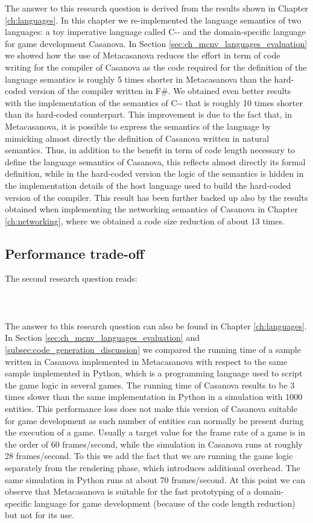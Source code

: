 The answer to this research question is derived from the results shown in Chapter \ref{ch:languages}. In this chapter we re-implemented the language semantics of two languages: a toy imperative language called C-{}- and the domain-specific language for game development Casanova. In Section \ref{sec:ch_mcnv_languages_evaluation} we showed how the use of Metacasanova reduces the effort in term of code writing for the compiler of Casanova as the code required for the definition of the language semantics is roughly 5 times shorter in Metacasanova than the hard-coded version of the compiler written in F\#. We obtained even better results with the implementation of the semantics of C-{}- that is roughly 10 times shorter than its hard-coded counterpart. This improvement is due to the fact that, in Metacasanova, it is possible to express the semantics of the language by mimicking almost directly the definition of Casanova written in natural semantics. Thus, in addition to the benefit in term of code length necessary to define the language semantics of Casanova, this reflects almost directly its formal definition, while in the hard-coded version the logic of the semantics is hidden in the implementation details of the host language used to build the hard-coded version of the compiler. This result has been further backed up also by the results obtained when implementing the networking semantics of Casanova in Chapter \ref{ch:networking}, where we obtained a code size reduction of about 13 times.

\subsection{Performance trade-off}
\label{subsec:ch_conclusion_rq2}
The second research question reads:\\\\
\researchQuestion{\rqContentTwo}\\\\

The answer to this research question can also be found in Chapter \ref{ch:languages}. In Section  \ref{sec:ch_mcnv_languages_evaluation} and \ref{subsec:code_generation_discussion} we compared the running time of a sample written in Casanova implemented in Metacasanova with respect to the same sample implemented in Python, which is a programming language used to script the game logic in several games. The running time of Casanova results to be 3 times slower than the same implementation in Python in a simulation with 1000 entities. This performance loss does not make this version of Casanova suitable for game development as such number of entities can normally be present during the execution of a game. Usually a target value for the frame rate of a game is in the order of 60 frames/second, while the simulation in Casanova runs at roughly 28 frames/second. To this we add the fact that we are running the game logic separately from the rendering phase, which introduces additional overhead. The same simulation in Python runs at about 70 frames/second. At this point we can observe that Metacasanova is suitable for the fast prototyping of a domain-specific language for game development (because of the code length reduction) but not for its use.
\newpage

